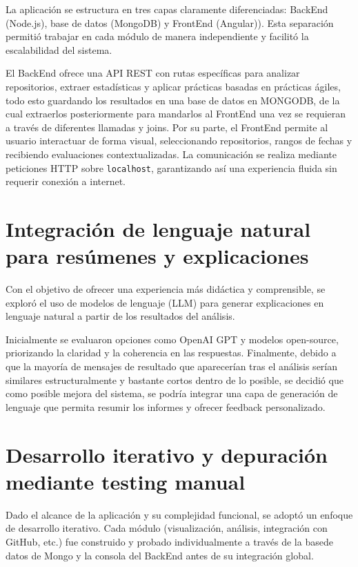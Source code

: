 La aplicación se estructura en tres capas claramente diferenciadas: BackEnd (Node.js), base de datos (MongoDB) y FrontEnd (Angular)). Esta separación permitió trabajar en cada módulo de manera independiente y facilitó la escalabilidad del sistema.

El BackEnd ofrece una API REST con rutas específicas para analizar repositorios, extraer estadísticas y aplicar prácticas basadas en prácticas ágiles, todo esto guardando los resultados en una base de datos en MONGODB, de la cual extraerlos posteriormente para mandarlos al FrontEnd una vez se requieran a través de diferentes llamadas y joins. Por su parte, el FrontEnd permite al usuario interactuar de forma visual, seleccionando repositorios, rangos de fechas y recibiendo evaluaciones contextualizadas. La comunicación se realiza mediante peticiones HTTP sobre \texttt{localhost}, garantizando así una experiencia fluida sin requerir conexión a internet.

\section{Integración de lenguaje natural para resúmenes y explicaciones}

Con el objetivo de ofrecer una experiencia más didáctica y comprensible, se exploró el uso de modelos de lenguaje (LLM) para generar explicaciones en lenguaje natural a partir de los resultados del análisis. 

Inicialmente se evaluaron opciones como OpenAI GPT y modelos open-source, priorizando la claridad y la coherencia en las respuestas. Finalmente, debido a que la mayoría de mensajes de resultado que aparecerían tras el análisis serían similares estructuralmente y bastante cortos dentro de lo posible, se decidió que como posible mejora del sistema, se podría integrar una capa de generación de lenguaje que permita resumir los informes y ofrecer feedback personalizado.

\section{Desarrollo iterativo y depuración mediante testing manual}

Dado el alcance de la aplicación y su complejidad funcional, se adoptó un enfoque de desarrollo iterativo. Cada módulo (visualización, análisis, integración con GitHub, etc.) fue construido y probado individualmente a través de la basede datos de Mongo y la consola del BackEnd antes de su integración global.

